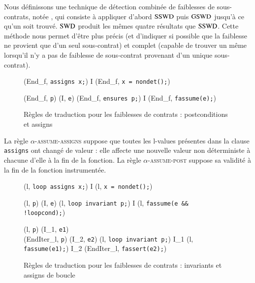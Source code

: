 Nous définissons une technique de détection combinée de faiblesses de
sous-contrats, notée \SWD, qui consiste à appliquer d'abord $\mathrm{SSWD}$ puis $\mathrm{GSWD}$
jusqu'à ce qu'un \SWCE soit trouvé. 
$\mathrm{SWD}$ produit les mêmes quatre résultats que $\mathrm{SSWD}$.
Cette méthode nous permet d'être plus précis (et d'indiquer si possible que la
faiblesse ne provient que d'un seul sous-contrat) et complet (capable de trouver
un \GSWCE même lorsqu'il n'y a pas de faiblesse de sous-contrat provenant d'un
unique sous-contrat).




\begin{figure}[bt]
  \scriptsize{
    {
      {}
      {(End_f, \mbox{\lstinline'assigns x;'})
        I \concat (End_f, \mbox{\lstinline'x = nondet();'})}{}
    }

    {
      {(End_f, \mbox{\lstinline'p'})  (I, \mbox{\lstinline'e'})}
      {(End_f, \mbox{\lstinline'ensures p;'})
        I \concat (End_f, \mbox{\lstinline'fassume(e);'})}{}
    }
  }
  \caption{Règles de traduction pour les faiblesses de contrats :
    postconditions et assigns}
  \label{fig:assume-annot}
\end{figure}

La règle \textsc{$\alpha$-assume-assigns} suppose que toutes les l-values
présentes dans la clause \lstinline'assigns' ont changé de valeur : elle affecte
une nouvelle valeur non déterministe à chacune d'elle à la fin de la fonction.
La règle \textsc{$\alpha$-assume-post} suppose sa validité à la fin de la
fonction instrumentée.

\begin{figure}[bt]
  \scriptsize{
    {
      {}
      {(l, \mbox{\lstinline'loop assigns x;'})
        I \concat (l, \mbox{\lstinline'x = nondet();'})}{}
    }

    {
      {(l, \mbox{\lstinline'p'})  (I, \mbox{\lstinline'e'})}
      {
        (l, \mbox{\lstinline'loop invariant p;'}) 
        I \concat (l, \mbox{\lstinline'fassume(e && !loopcond);'})
      }{}
    }

    {
      {(l, \mbox{\lstinline'p'})  (I_1, \mbox{\lstinline'e1'}) \\
        (EndIter_l, \mbox{\lstinline'p'}) 
        (I_2, \mbox{\lstinline'e2'})}
      {
        (l, \mbox{\lstinline'loop invariant p;'}) 
        I_1 \concat (l, \mbox{\lstinline'fassume(e1);'})
        \concat I_2 \concat (EndIter_l, \mbox{\lstinline'fassert(e2);'})
      }{}
    }
  }
  \caption{Règles de traduction pour les faiblesses de contrats :
    invariants et assigns de boucle}
  \label{fig:assume-loop-annot}
\end{figure}


